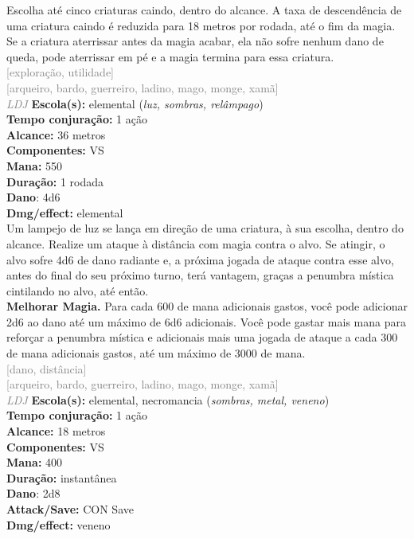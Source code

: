 \documentclass{RPG_Adventure}[2021/10/20]
\begin{document}
{\normalsize Escolha até cinco criaturas caindo, dentro do alcance. A taxa de descendência de uma criatura caindo é reduzida para 18 metros por rodada, até o fim da magia. Se a criatura aterrissar antes da magia acabar, ela não sofre nenhum dano de queda, pode aterrissar em pé e a magia termina para essa criatura.\\}
{\scriptsize \textcolor{gray}{[exploração, utilidade]\\}}
{\scriptsize \textcolor{gray}{[arqueiro, bardo, guerreiro, ladino, mago, monge, xamã]\\}}
{\tiny \textcolor{gray}{\textit{LDJ}}}\jump{}
{\small \t \textbf{Escola(s):} elemental (\textit{luz, sombras, relâmpago})\\\t \textbf{Tempo conjuração:} 1 ação\\\t \textbf{Alcance:} 36 metros\\\t \textbf{Componentes:} VS\\\t \textbf{Mana:} 550\\\t \textbf{Duração:} 1 rodada\\\t \textbf{Dano}: 4d6\\\t \textbf{Dmg/effect:} elemental\\}
{\normalsize Um lampejo de luz se lança em direção de uma criatura, à sua escolha, dentro do alcance. Realize um ataque à distância com magia contra o alvo. Se atingir, o alvo sofre 4d6 de dano radiante e, a próxima jogada de ataque contra esse alvo, antes do final do seu próximo turno, terá vantagem, graças a penumbra mística cintilando no alvo, até então.\\\t \textbf{Melhorar Magia.} Para cada 600 de mana adicionais gastos, você pode adicionar 2d6 ao dano até um máximo de 6d6 adicionais. Você pode gastar mais mana para reforçar a penumbra mística e adicionais mais uma jogada de ataque a cada 300 de mana adicionais gastos, até um máximo de 3000 de mana.\\}
{\scriptsize \textcolor{gray}{[dano, distância]\\}}
{\scriptsize \textcolor{gray}{[arqueiro, bardo, guerreiro, ladino, mago, monge, xamã]\\}}
{\tiny \textcolor{gray}{\textit{LDJ}}}\jump{}
{\small \t \textbf{Escola(s):} elemental, necromancia (\textit{sombras, metal, veneno})\\\t \textbf{Tempo conjuração:} 1 ação\\\t \textbf{Alcance:} 18 metros\\\t \textbf{Componentes:} VS\\\t \textbf{Mana:} 400\\\t \textbf{Duração:} instantânea\\\t \textbf{Dano}: 2d8\\\t \textbf{Attack/Save:} CON Save\\\t \textbf{Dmg/effect:} veneno\\}
\end{document}
